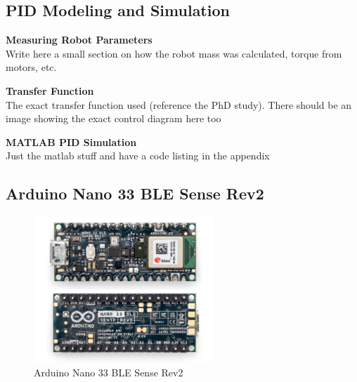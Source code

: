 \documentclass{article}
\begin{document}
\subsection{PID Modeling and Simulation}

\textbf{Measuring Robot Parameters} \\

Write here a small section on how the robot mass was calculated, torque from motors, etc.

\textbf{Transfer Function} \\


The exact transfer function used (reference the PhD study). There should be an image showing the exact control diagram here too

\textbf{MATLAB PID Simulation} \\

Just the matlab stuff and have a code listing in the appendix

\subsection{Arduino Nano 33 BLE Sense Rev2}

\begin{figure}[H]
    \centering
    \includegraphics[width=0.6\textwidth]{Figures/arduino.jpg} %
    \caption{Arduino Nano 33 BLE Sense Rev2}
    \label{fig:arduino}
\end{figure}
\end{document}
